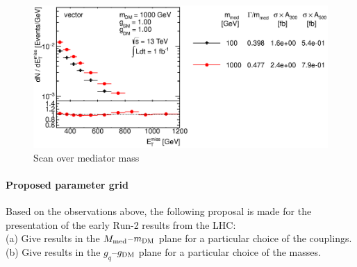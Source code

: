 \begin{figure}
\centering
\includegraphics[width=0.9\linewidth]{figures/monojet/scan_mMed_V_1000.eps}
\caption{Scan over mediator mass}
\label{fig:monojet_scan_V_mMed1000}
\end{figure}


\paragraph{Proposed parameter grid}

Based on the observations above, the following proposal is made for the presentation of the early Run-2 results from the LHC:\\
(a) Give results in the $M_{\rm{med}}$--$m_{\rm{DM}}$ plane for a particular choice of the couplings.\\
(b) Give results in the $g_q$--$g_{\rm{DM}}$ plane for a particular choice of the masses.


